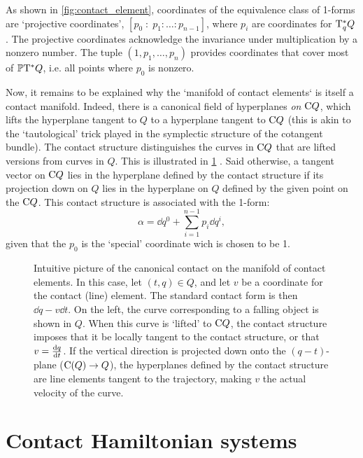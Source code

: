 As shown in \cref{fig:contact_element}, coordinates of the equivalence class of 1-forms are `projective coordinates', \([p_0\;:\;p_1:\ldots :p_{n-1}]\), where \(p_i\) are coordinates for \(\mathrm{T}_{q}^*Q\). The projective coordinates acknowledge the invariance under multiplication by a nonzero number. The tuple \((1, p_1, \ldots, p_n)\) provides coordinates that cover most of \(\mathbb{P}\mathrm{T}^* Q\), i.e. all points where \(p_0\) is nonzero.

Now, it remains to be explained why the `manifold of contact elements` is itself a contact manifold. Indeed, there is a canonical field of hyperplanes \emph{on} \(\mathrm{C}Q\), which lifts the hyperplane tangent to \(Q\) to a hyperplane tangent to \(\mathrm{C}Q\) (this is akin to the `tautological' trick played in the symplectic structure of the cotangent bundle). The contact structure distinguishes the curves in \(\mathrm{C}Q\) that are lifted versions from curves in \(Q\). This is illustrated in \cref{fig:contact_lift} \cite{Burke1985}.
Said otherwise, a tangent vector on \(\mathrm{C}Q\) lies in the hyperplane defined by the contact structure if its projection down on \(Q\) lies in the hyperplane on \(Q\) defined by the given point on the \(\mathrm{C}Q\). This contact structure is associated with the 1-form:
\begin{equation}
     \alpha = \dd{q}^0 + \sum_{i = 1}^{n-1} p_i\dd{q}^i,
\end{equation}
given that the \(p_0\) is the `special' coordinate wich is chosen to be 1.

\begin{figure}[h!]
    \centering
    
    \caption{Intuitive picture of the canonical contact on the manifold of contact elements. In this case, let \( (t, q) \in Q\), and let \(v\) be a coordinate for the contact (line) element. The standard contact form is then \(\dd{q} - v\dd{t}\). On the left, the curve corresponding to a falling object is shown in \(Q\). When this curve is `lifted' to \(\mathrm{C}Q\), the contact structure imposes that it be locally tangent to the contact structure, or that \(v = \dv{q}{t}\). If the vertical direction is projected down onto the \((q-t)\)-plane (\(\mathrm{C}(Q) \to Q\)), the hyperplanes defined by the contact structure are line elements tangent to the trajectory, making \(v\) the actual velocity of the curve.}
    \label{fig:contact_lift}
\end{figure}

\section{Contact Hamiltonian systems}
\label{sec:contact_ham_systems}

